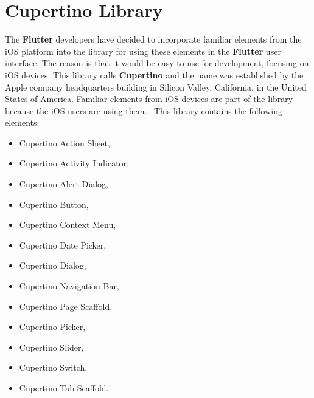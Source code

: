 \section{Cupertino Library}\label{sec:ios-specific-ui-widgets}
The \textbf{Flutter} developers have decided to incorporate familiar elements from the iOS platform into the library for using these elements in the \textbf{Flutter} user interface.
The reason is that it would be easy to use for development, focusing on iOS devices.
This library calls \textbf{Cupertino} and the name was established by the Apple company headquarters building in Silicon Valley, California, in the United States of America.
Familiar elements from iOS devices are part of the library because the iOS users are using them.~\cite{cupertino}
This library contains the following elements:
\begin{itemize}
    \item Cupertino Action Sheet,
    \item Cupertino Activity Indicator,
    \item Cupertino Alert Dialog,
    \item Cupertino Button,
    \item Cupertino Context Menu,
    \item Cupertino Date Picker,
    \item Cupertino Dialog,
    \item Cupertino Navigation Bar,
    \item Cupertino Page Scaffold,
    \item Cupertino Picker,
    \item Cupertino Slider,
    \item Cupertino Switch,
    \item Cupertino Tab Scaffold.
\end{itemize}
